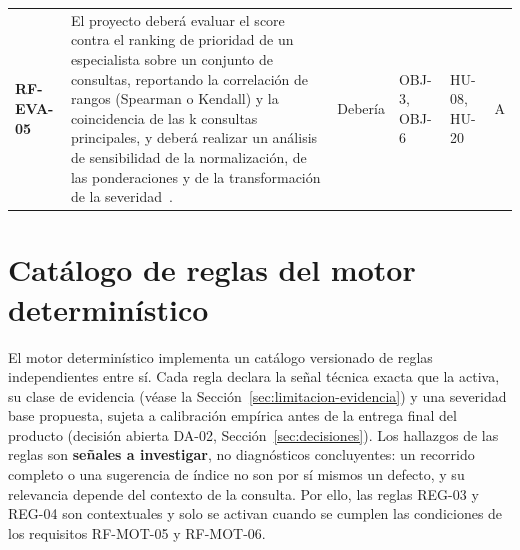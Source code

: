 \documentclass[11pt,a4paper]{report}
\begin{document}
\begin{footnotesize}
\begin{xltabular}{\linewidth}{@{}p{1.7cm}Xp{1.1cm}p{1.3cm}p{1.6cm}p{0.9cm}@{}}
\textbf{RF-EVA-05} & El proyecto deberá evaluar el score contra el ranking de prioridad de un especialista sobre un conjunto de consultas, reportando la correlación de rangos (Spearman o Kendall) y la coincidencia de las k consultas principales, y deberá realizar un análisis de sensibilidad de la normalización, de las ponderaciones y de la transformación de la severidad~\cite{R32}. & Debería & OBJ-3, OBJ-6 & HU-08, HU-20 & A \\
\end{xltabular}
\end{footnotesize}


\section{Cat\'alogo de reglas del motor determin\'istico}
\label{sec:catalogo-reglas}

El motor determin\'istico implementa un cat\'alogo versionado de reglas independientes entre s\'i. Cada regla declara la se\~nal t\'ecnica exacta que la activa, su clase de evidencia (v\'ease la Secci\'on~\ref{sec:limitacion-evidencia}) y una severidad base propuesta, sujeta a calibraci\'on emp\'irica antes de la entrega final del producto (decisi\'on abierta DA-02, Secci\'on~\ref{sec:decisiones}). Los hallazgos de las reglas son \textbf{se\~nales a investigar}, no diagn\'osticos concluyentes: un recorrido completo o una sugerencia de \'indice no son por s\'i mismos un defecto, y su relevancia depende del contexto de la consulta. Por ello, las reglas REG-03 y REG-04 son contextuales y solo se activan cuando se cumplen las condiciones de los requisitos RF-MOT-05 y RF-MOT-06.
\end{document}
